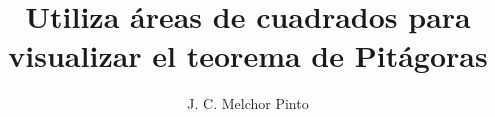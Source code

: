 \documentclass[12pt]{guia}
\title{Utiliza áreas de cuadrados para visualizar el teorema de Pitágoras}
\author{J. C. Melchor Pinto}
\begin{document}
\pagestyle{headandfoot}
\addpoints
\INFO
\printanswers

\newpage
\begin{questions}
    
    
    
    
    
    
    
    
    
\end{questions}
\end{document}
